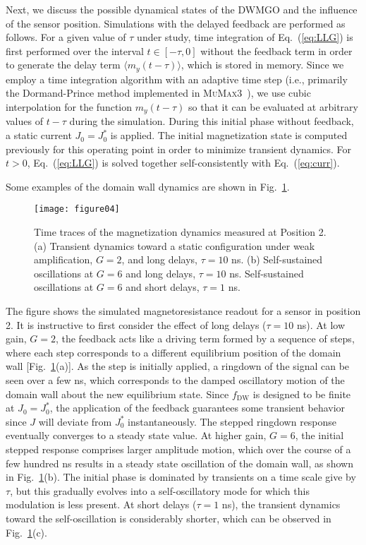 \documentclass[aip,reprint,amsmath,amssymb,floatfix,superscriptaddress]{revtex4-1}
\begin{document}
Next, we discuss the possible dynamical states of the DWMGO and the influence of the sensor position. Simulations with the delayed feedback are performed as follows. For a given value of $\tau$ under study, time integration of Eq.~(\ref{eq:LLG}) is first performed over the interval $t \in [-\tau,0]$ without the feedback term in order to generate the delay term $\langle m_y(t-\tau) \rangle$, which is stored in memory. Since we employ a time integration algorithm with an adaptive time step (i.e., primarily the Dormand-Prince method implemented in \textsc{MuMax3}~\cite{Vansteenkiste:2014et}), we use cubic interpolation for the function $m_y(t-\tau)$ so that it can be evaluated at arbitrary values of $t-\tau$ during the simulation. During this initial phase without feedback, a static current $J_0 = J_0^*$ is applied. The initial magnetization state is computed previously for this operating point in order to minimize transient dynamics. For $t>0$, Eq.~(\ref{eq:LLG}) is solved together self-consistently with Eq.~(\ref{eq:curr}).


Some examples of the domain wall dynamics are shown in Fig.~\ref{fig:timetrace}.
%
\begin{figure}
\centering\texttt{[image: figure04]}
\caption{Time traces of the magnetization dynamics measured at Position 2. (a) Transient dynamics toward a static configuration under weak amplification, $G = 2$, and long delays, $\tau = 10$ ns. (b) Self-sustained oscillations at $G = 6$ and long delays, $\tau = 10$ ns. Self-sustained oscillations at $G = 6$ and short delays, $\tau = 1$ ns. }
\label{fig:timetrace}
\end{figure}
%
The figure shows the simulated magnetoresistance readout for a sensor in position 2. It is instructive to first consider the effect of long delays ($\tau = 10$ ns). At low gain, $G = 2$, the feedback acts like a driving term formed by a sequence of steps, where each step corresponds to a different equilibrium position of the domain wall [Fig.~\ref{fig:timetrace}(a)]. As the step is initially applied, a ringdown of the signal can be seen over a few ns, which corresponds to the damped oscillatory motion of the domain wall about the new equilibrium state. Since $f_\mathrm{DW}$ is designed to be finite at $J_0 = J_0^*$, the application of the feedback guarantees some transient behavior since $J$ will deviate from $J_0^*$ instantaneously. The stepped ringdown response eventually converges to a steady state value. At higher gain, $G = 6$, the initial stepped response comprises larger amplitude motion, which over the course of a few hundred ns results in a steady state oscillation of the domain wall, as shown in Fig.~\ref{fig:timetrace}(b). The initial phase is dominated by transients on a time scale give by $\tau$, but this gradually evolves into a self-oscillatory mode for which this modulation is less present. At short delays ($\tau = 1$ ns), the transient dynamics toward the self-oscillation is considerably shorter, which can be observed in Fig.~\ref{fig:timetrace}(c).
\end{document}
